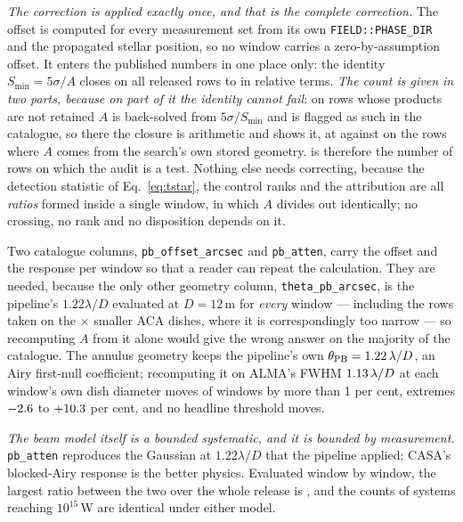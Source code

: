 \emph{The correction is applied exactly once, and that is the complete
correction.} The offset is computed for every measurement set from its own
\texttt{FIELD::PHASE\_DIR} and the propagated stellar position, so no window
carries a zero-by-assumption offset. It enters the published numbers in one
place only: the identity $S_{\min}=5\sigma/A$ closes on all \PbSminClosed{}
released rows to \PbSminWorstRes{} in relative terms. \emph{The count is
given in two parts, because on part of it the identity cannot fail}: on
\PbSminTaut{} rows whose products are not retained $A$ is back-solved from
$5\sigma/S_{\min}$ and is flagged as such in the catalogue, so there the
closure is arithmetic and shows it, at \PbSminTautRes{} against
\PbSminIndepRes{} on the \PbSminIndep{} rows where $A$ comes from the
search's own stored geometry. \PbSminIndep{} is therefore the number of rows
on which the audit is a test. Nothing else needs correcting, because the
detection statistic of Eq.~\ref{eq:tstar}, the control ranks and the
attribution are all \emph{ratios} formed inside a single window, in which $A$
divides out identically; no crossing, no rank and no disposition depends on
it.

Two catalogue columns, \texttt{pb\_offset\_arcsec} and \texttt{pb\_atten},
carry the offset and the response per window so that a reader can repeat the
calculation. They are needed, because the only other geometry column,
\texttt{theta\_pb\_arcsec}, is the pipeline's $1.22\lambda/D$ evaluated at
$D=12$\,m for \emph{every} window --- including the \PbNAcaRow{} rows taken
on the \PbAcaRatio$\times$ smaller ACA dishes, where it is correspondingly
too narrow --- so recomputing $A$ from it alone would give the wrong answer
on the majority of the catalogue. The annulus geometry keeps the pipeline's
own $\theta_{\rm PB}=1.22\,\lambda/D$, an Airy first-null
coefficient; recomputing it on ALMA's FWHM $1.13\,\lambda/D$ at each
window's own dish diameter moves \NPbFixOnePct{} of \NWindows{} windows by
more than 1 per cent, extremes $-2.6$ to $+10.3$ per cent, and
no headline threshold moves.

\emph{The beam model itself is a bounded systematic, and it is bounded by
measurement.} \texttt{pb\_atten} reproduces the Gaussian at $1.22\lambda/D$
that the pipeline applied; CASA's blocked-Airy response is the better
physics. Evaluated window by window, the largest ratio between the two over
the whole release is \PbModelMax, and the counts of systems reaching
$10^{15}$\,W are identical under either model.

